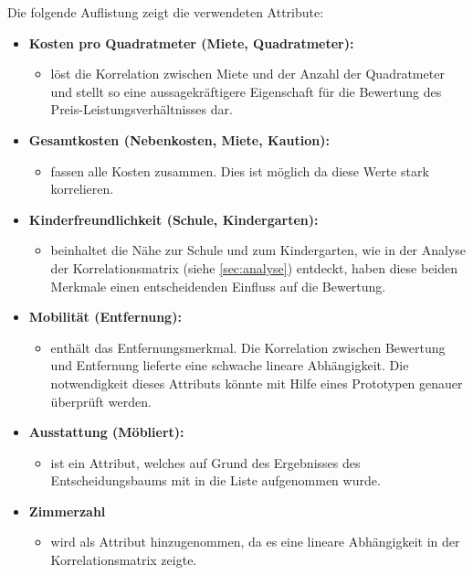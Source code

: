 Die folgende Auflistung zeigt die verwendeten Attribute:
\begin{itemize}\label{lst:Eigenschaften}
    \item \textbf{Kosten pro Quadratmeter (Miete, Quadratmeter):}
    \begin{itemize}
        \item löst die Korrelation zwischen Miete und der Anzahl der Quadratmeter und
        stellt so eine aussagekräftigere Eigenschaft für die Bewertung des Preis-Leistungsverhältnisses dar.
    \end{itemize}
    \item \textbf{Gesamtkosten (Nebenkosten, Miete, Kaution):}
    \begin{itemize}
        \item  fassen alle Kosten zusammen. Dies ist möglich da diese Werte stark korrelieren.
    \end{itemize}
    \item \textbf{Kinderfreundlichkeit (Schule, Kindergarten):} 
    \begin{itemize}
        \item beinhaltet die Nähe zur Schule und zum Kindergarten, wie in 
        der Analyse der Korrelationsmatrix (siehe \autoref{sec:analyse}) entdeckt, haben diese beiden 
        Merkmale einen entscheidenden Einfluss auf die Bewertung.
    \end{itemize}
    \item \textbf{Mobilität (Entfernung):} 
    \begin{itemize}
        \item enthält das Entfernungsmerkmal. Die Korrelation zwischen Bewertung und Entfernung lieferte eine schwache lineare 
        Abhängigkeit. Die notwendigkeit dieses Attributs könnte mit Hilfe eines Prototypen genauer überprüft werden.
    \end{itemize}
    \item \textbf{Ausstattung (Möbliert):}
    \begin{itemize}
        \item ist ein Attribut, welches auf Grund des Ergebnisses des Entscheidungsbaums
        mit in die Liste aufgenommen wurde.
    \end{itemize}
    \item \textbf{Zimmerzahl} 
    \begin{itemize}
        \item wird als Attribut hinzugenommen, da es eine lineare Abhängigkeit in der Korrelationsmatrix zeigte. 
    \end{itemize}
\end{itemize}

